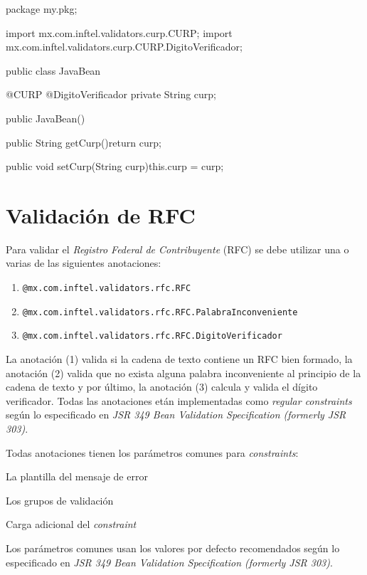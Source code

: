 \documentclass[12pt,letterpaper]{article}
\begin{document}
\begin{listing}{1}
package my.pkg;

import mx.com.inftel.validators.curp.CURP;
import mx.com.inftel.validators.curp.CURP.DigitoVerificador;

public class JavaBean{

    @CURP
    @DigitoVerificador
    private String curp;

    public JavaBean(){}

    public String getCurp(){return curp;}

    public void setCurp(String curp){this.curp = curp;}
}
\end{listing}

\section{Validación de RFC}

Para validar el \emph{Registro Federal de Contribuyente} (RFC) se debe utilizar una o varias de
las siguientes anotaciones:

\begin{enumerate}[noitemsep]
\item \texttt{@mx.com.inftel.validators.rfc.RFC}
\item \texttt{@mx.com.inftel.validators.rfc.RFC.PalabraInconveniente}
\item \texttt{@mx.com.inftel.validators.rfc.RFC.DigitoVerificador}
\end{enumerate}

La anotación (1) valida si la cadena de texto contiene un RFC bien formado, la anotación (2) valida que no exista
alguna palabra inconveniente al principio de la cadena de texto y por último, la anotación (3) calcula y valida
el dígito verificador. Todas las anotaciones etán implementadas como \emph{regular constraints} según lo especificado
en \emph{JSR 349 Bean Validation Specification (formerly JSR 303)}.

Todas anotaciones tienen los parámetros comunes para \emph{constraints}:

\begin{description}[noitemsep]
\item[message] La plantilla del mensaje de error
\item[groups] Los grupos de validación
\item[payload] Carga adicional del \emph{constraint}
\end{description}

Los parámetros comunes usan los valores por defecto recomendados según lo especificado en \emph{JSR 349 Bean
Validation Specification (formerly JSR 303)}.
\end{document}
